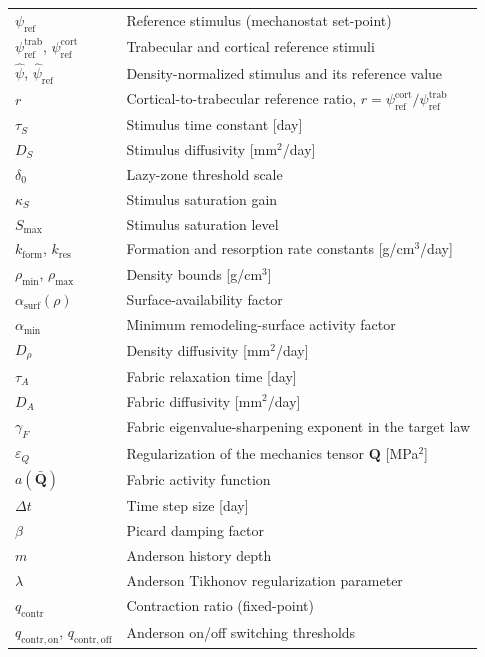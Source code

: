 {\begin{longtable}{@{} l p{} @{}}
$\psi_{\mathrm{ref}}$ & Reference stimulus (mechanostat set-point) \\
$\psi_{\mathrm{ref}}^{\mathrm{trab}}$, $\psi_{\mathrm{ref}}^{\mathrm{cort}}$ & Trabecular and cortical reference stimuli \\
$\hat{\psi}$, $\hat{\psi}_{\mathrm{ref}}$ & Density-normalized stimulus and its reference value \\
$r$ & Cortical-to-trabecular reference ratio, $r=\psi_{\mathrm{ref}}^{\mathrm{cort}}/\psi_{\mathrm{ref}}^{\mathrm{trab}}$ \\
$\tau_S$ & Stimulus time constant [day] \\
$D_S$ & Stimulus diffusivity [mm$^2$/day] \\
$\delta_0$ & Lazy-zone threshold scale \\
$\kappa_S$ & Stimulus saturation gain \\
$S_{\max}$ & Stimulus saturation level \\
$k_{\mathrm{form}}$, $k_{\mathrm{res}}$ & Formation and resorption rate constants [g/cm$^3$/day] \\
$\rho_{\min}$, $\rho_{\max}$ & Density bounds [g/cm$^3$] \\
$\alpha_{\mathrm{surf}}(\rho)$ & Surface-availability factor \\
$\alpha_{\min}$ & Minimum remodeling-surface activity factor \\
$D_\rho$ & Density diffusivity [mm$^2$/day] \\
$\tau_A$ & Fabric relaxation time [day] \\
$D_A$ & Fabric diffusivity [mm$^2$/day] \\
$\gamma_F$ & Fabric eigenvalue-sharpening exponent in the target law \\
$\varepsilon_Q$ & Regularization of the mechanics tensor $\mathbf{Q}$ [MPa$^2$] \\
$a(\bar{\mathbf{Q}})$ & Fabric activity function \\
$\Delta t$ & Time step size [day] \\
$\beta$ & Picard damping factor \\
$m$ & Anderson history depth \\
$\lambda$ & Anderson Tikhonov regularization parameter \\
$q_{\mathrm{contr}}$ & Contraction ratio (fixed-point) \\
$q_{\mathrm{contr,on}}$, $q_{\mathrm{contr,off}}$ & Anderson on/off switching thresholds \\

\end{longtable}}

